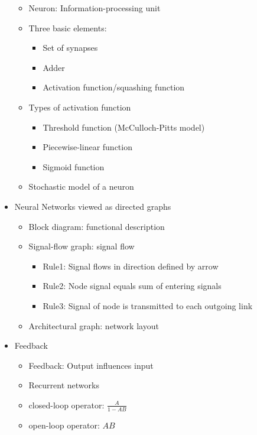 \documentclass[paper=a4, fontsize=11pt]{scrartcl} %
\numberwithin{equation}{section} %
\numberwithin{figure}{section} %
\numberwithin{table}{section} %
\begin{document}
\begin{itemize}
\begin{itemize}
\item Neuron: Information-processing unit
\item Three basic elements:
\begin{itemize}
\item Set of synapses
\item Adder
\item Activation function/squashing function
\end{itemize}

\item Types of activation function
\begin{itemize}
\item Threshold function (McCulloch-Pitts model)
\item Piecewise-linear function
\item Sigmoid function
\end{itemize}

\item Stochastic model of a neuron
\end{itemize}

\item Neural Networks viewed as directed graphs
\begin{itemize}
	\item Block diagram: functional description
	\item Signal-flow graph: signal flow
	\begin{itemize}
		\item Rule1: Signal flows in direction defined by arrow
		\item Rule2: Node signal equals sum of entering signals
		\item Rule3: Signal of node is transmitted to each outgoing link
	\end{itemize}
	\item Architectural graph: network layout
\end{itemize}

\item Feedback
	\begin{itemize}
		\item Feedback: Output influences input
		\item Recurrent networks
		\item closed-loop operator: $\frac{A}{1-AB}$
		\item open-loop operator: $AB$
	\end{itemize}


\end{itemize}
\end{document}
